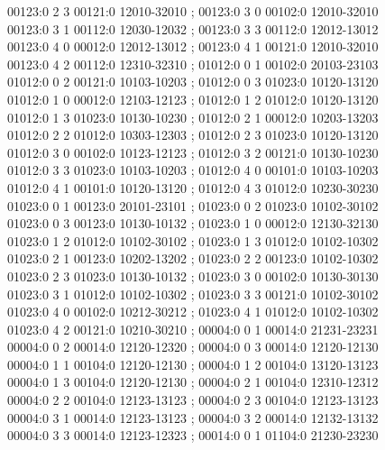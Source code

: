 \documentclass[11pt]{article}
\theoremstyle{remark}
\numberwithin{equation}{section}
\numberwithin{table}{section}
\begin{document}
\begin{flushleft}
00123:0 2 3 00121:0 12010-32010 ; 00123:0 3 0 00102:0 12010-32010\\
00123:0 3 1 00112:0 12030-12032 ; 00123:0 3 3 00112:0 12012-13012\\
00123:0 4 0 00012:0 12012-13012 ; 00123:0 4 1 00121:0 12010-32010\\
00123:0 4 2 00112:0 12310-32310 ; 01012:0 0 1 00102:0 20103-23103\\
01012:0 0 2 00121:0 10103-10203 ; 01012:0 0 3 01023:0 10120-13120\\
01012:0 1 0 00012:0 12103-12123 ; 01012:0 1 2 01012:0 10120-13120\\
01012:0 1 3 01023:0 10130-10230 ; 01012:0 2 1 00012:0 10203-13203\\
01012:0 2 2 01012:0 10303-12303 ; 01012:0 2 3 01023:0 10120-13120\\
01012:0 3 0 00102:0 10123-12123 ; 01012:0 3 2 00121:0 10130-10230\\
01012:0 3 3 01023:0 10103-10203 ; 01012:0 4 0 00101:0 10103-10203\\
01012:0 4 1 00101:0 10120-13120 ; 01012:0 4 3 01012:0 10230-30230\\
01023:0 0 1 00123:0 20101-23101 ; 01023:0 0 2 01023:0 10102-30102\\
01023:0 0 3 00123:0 10130-10132 ; 01023:0 1 0 00012:0 12130-32130\\
01023:0 1 2 01012:0 10102-30102 ; 01023:0 1 3 01012:0 10102-10302\\
01023:0 2 1 00123:0 10202-13202 ; 01023:0 2 2 00123:0 10102-10302\\
01023:0 2 3 01023:0 10130-10132 ; 01023:0 3 0 00102:0 10130-30130\\
01023:0 3 1 01012:0 10102-10302 ; 01023:0 3 3 00121:0 10102-30102\\
01023:0 4 0 00102:0 10212-30212 ; 01023:0 4 1 01012:0 10102-10302\\
01023:0 4 2 00121:0 10210-30210 ; 00004:0 0 1 00014:0 21231-23231\\
00004:0 0 2 00014:0 12120-12320 ; 00004:0 0 3 00014:0 12120-12130\\
00004:0 1 1 00104:0 12120-12130 ; 00004:0 1 2 00104:0 13120-13123\\
00004:0 1 3 00104:0 12120-12130 ; 00004:0 2 1 00104:0 12310-12312\\
00004:0 2 2 00104:0 12123-13123 ; 00004:0 2 3 00104:0 12123-13123\\
00004:0 3 1 00014:0 12123-13123 ; 00004:0 3 2 00014:0 12132-13132\\
00004:0 3 3 00014:0 12123-12323 ; 00014:0 0 1 01104:0 21230-23230\\

\end{flushleft}
\end{document}
